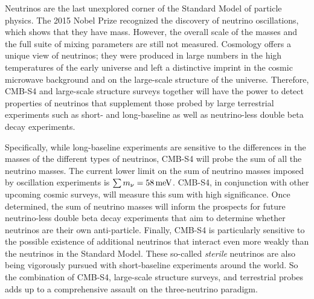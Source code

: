 Neutrinos are the last unexplored corner of the Standard Model of particle physics.  The 2015 Nobel Prize recognized the discovery of neutrino oscillations, which shows that they have mass. However, the overall scale of the masses and the full suite of mixing parameters are still not measured.  Cosmology offers a unique view of neutrinos; they were produced in large numbers in the high temperatures of the early universe and left a distinctive imprint in the cosmic microwave background and on the large-scale structure of the universe. Therefore, CMB-S4 and large-scale structure surveys together will have the power to detect properties of neutrinos that supplement those probed by large terrestrial experiments such as short- and long-baseline as well as neutrino-less double beta decay experiments.

Specifically, while long-baseline experiments are sensitive to the differences in the masses of the different types of neutrinos, CMB-S4  will probe the sum of all the neutrino masses. The current lower limit on the sum of neutrino masses imposed by oscillation experiments is \mbox{$\sum m_\nu=58\,\rm{meV}$}. CMB-S4, in conjunction with other upcoming cosmic surveys, will measure this sum with high significance. Once determined, the sum of neutrino masses will inform the prospects for future neutrino-less double beta decay experiments that aim to determine whether neutrinos are their own anti-particle. Finally, CMB-S4 is particularly sensitive to the possible existence of additional neutrinos that interact even more weakly than the neutrinos in the Standard Model. These so-called {\it sterile} neutrinos are also being vigorously pursued with short-baseline experiments around the world. So the combination of CMB-S4, large-scale structure surveys, and terrestrial probes adds up to a comprehensive assault on the three-neutrino paradigm. 
